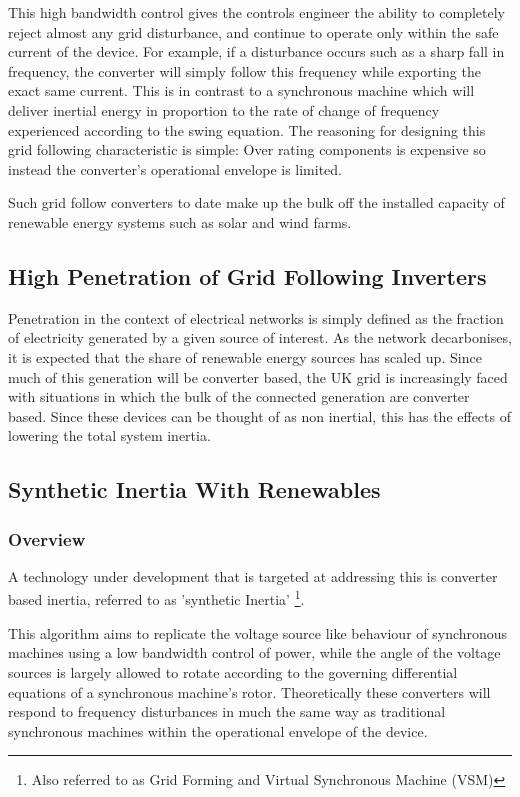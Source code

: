\documentclass[11pt]{article}
\numberwithin{equation}{section}
\begin{document}
This high bandwidth control gives the controls engineer the ability to completely reject almost any grid disturbance, and continue to operate only within the safe current of the device. For example, if a disturbance occurs such as a sharp fall in frequency, the converter will simply follow this frequency while exporting the exact same current. This is in contrast to a synchronous machine which will deliver inertial energy in proportion to the rate of change of frequency experienced according to the swing equation. The reasoning for designing this grid following characteristic is simple: Over rating components is expensive so instead the converter's operational envelope is limited.

Such grid follow converters to date make up the bulk off the installed capacity of renewable energy systems such as solar and wind farms.

\subsection{High Penetration of Grid Following Inverters}
\label{sec:org7782850}
Penetration in the context of electrical networks is simply defined as the fraction of electricity generated by a given source of interest. As the network decarbonises, it is expected that the share of renewable energy sources has scaled up. Since much of this generation will be converter based, the UK grid is increasingly faced with situations in which the bulk of the connected generation are converter based. Since these devices can be thought of as non inertial, this has the effects of lowering the total system inertia.

\subsection{Synthetic Inertia With Renewables}
\label{sec:orgdd44c93}
\subsubsection{Overview}
\label{sec:org4129b2c}
A technology under development that is targeted at addressing this is converter based inertia, referred to as 'synthetic Inertia' \footnote{Also referred to as Grid Forming and Virtual Synchronous Machine (VSM)}.

This algorithm aims to replicate the voltage source like behaviour of synchronous machines using a low bandwidth control of power, while the angle of the voltage sources is largely allowed to rotate according to the governing differential equations of a synchronous machine's rotor. Theoretically these converters will respond to frequency disturbances in much the same way as traditional synchronous machines within the operational envelope of the device.
\end{document}
